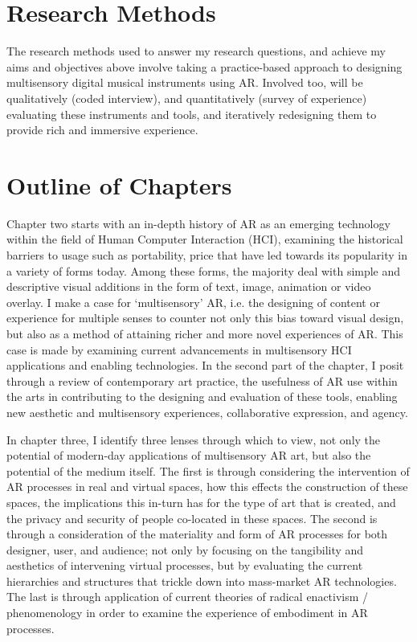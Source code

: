 \section{Research Methods}
The research methods used to answer my research questions, and achieve my aims and objectives above involve taking a practice-based approach to designing multisensory digital musical instruments using AR. Involved too, will be qualitatively (coded interview), and quantitatively (survey of experience) evaluating these instruments and tools, and iteratively redesigning them to provide rich and immersive experience.



\section{Outline of Chapters}
Chapter two starts with an in-depth history of AR as an emerging technology within the field of Human Computer Interaction (HCI), examining the historical barriers to usage such as portability, price that have led towards its popularity in a variety of forms today. Among these forms, the majority deal with simple and descriptive visual additions in the form of text, image, animation or video overlay. I make a case for `multisensory' AR, i.e. the designing of content or experience for multiple senses to counter not only this bias toward visual design, but also as a method of attaining richer and more novel experiences of AR. This case is made by examining current advancements in multisensory HCI applications and enabling technologies. In the second part of the chapter, I posit through a review of contemporary art practice, the usefulness of AR use within the arts in contributing to the designing and evaluation of these tools, enabling new aesthetic and multisensory experiences, collaborative expression, and agency.

In chapter three, I identify three lenses through which to view, not only the potential of modern-day applications of multisensory AR art, but also the potential of the medium itself. The first is through considering the intervention of AR processes in real and virtual spaces, how this effects the construction of these spaces, the implications this in-turn has for the type of art that is created, and the privacy and security of people co-located in these spaces. The second is through a consideration of the materiality and form of AR processes for both designer, user, and audience; not only by focusing on the tangibility and aesthetics of intervening virtual processes, but by evaluating the current hierarchies and structures that trickle down into mass-market AR technologies. The last is through application of current theories of radical enactivism / phenomenology in order to examine the experience of embodiment in AR processes.

